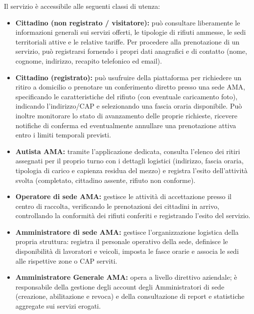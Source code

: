 Il servizio è accessibile alle seguenti classi di utenza:
\begin{itemize}[leftmargin=*]
    \item \textbf{Cittadino (non registrato / visitatore):} può consultare liberamente le informazioni generali sui servizi offerti, le tipologie di rifiuti ammesse, le sedi territoriali attive e le relative tariffe. Per procedere alla prenotazione di un servizio, può registrarsi fornendo i propri dati anagrafici e di contatto (nome, cognome, indirizzo, recapito telefonico ed email).
    
    \item \textbf{Cittadino (registrato):} può usufruire della piattaforma per richiedere un ritiro a domicilio o prenotare un conferimento diretto presso una sede AMA, specificando le caratteristiche del rifiuto (con eventuale caricamento foto), indicando l'indirizzo/CAP e selezionando una fascia oraria disponibile. Può inoltre monitorare lo stato di avanzamento delle proprie richieste, ricevere notifiche di conferma ed eventualmente annullare una prenotazione attiva entro i limiti temporali previsti.
    
    \item \textbf{Autista AMA:} tramite l'applicazione dedicata, consulta l'elenco dei ritiri assegnati per il proprio turno con i dettagli logistici (indirizzo, fascia oraria, tipologia di carico e capienza residua del mezzo) e registra l'esito dell'attività svolta (completato, cittadino assente, rifiuto non conforme).
    
    \item \textbf{Operatore di sede AMA:} gestisce le attività di accettazione presso il centro di raccolta, verificando le prenotazioni dei cittadini in arrivo, controllando la conformità dei rifiuti conferiti e registrando l'esito del servizio.
    
    \item \textbf{Amministratore di sede AMA:} gestisce l'organizzazione logistica della propria struttura: registra il personale operativo della sede, definisce le disponibilità di lavoratori e veicoli, imposta le fasce orarie e associa le sedi alle rispettive zone o CAP serviti.
    
    \item \textbf{Amministratore Generale AMA:} opera a livello direttivo aziendale; è responsabile della gestione degli account degli Amministratori di sede (creazione, abilitazione e revoca) e della consultazione di report e statistiche aggregate sui servizi erogati.
\end{itemize}
